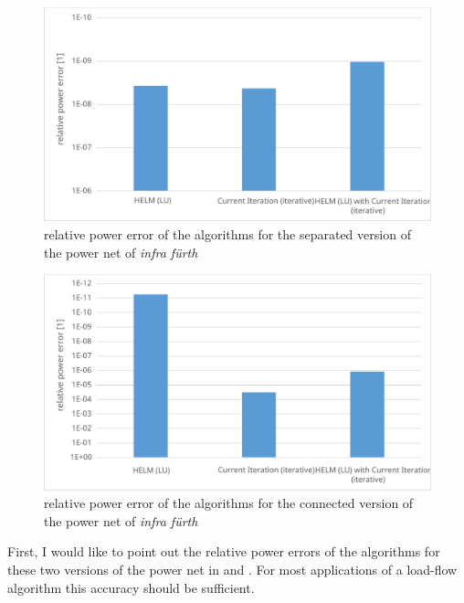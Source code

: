 \begin{figure}
	\centering
	\includegraphics[scale=0.7]{figures/big_net_separate_relative_power_error}
	\caption[Comparison, \emph{infra fürth}, separate, error]{relative power error of the algorithms for the separated version of the power net of \emph{infra fürth}}
	\label{fig:big_net_separate_relative_power_error}
\end{figure}

\begin{figure}
	\centering
	\includegraphics[scale=0.7]{figures/big_net_combined_relative_power_error}
	\caption[Comparison, \emph{infra fürth}, connected, error]{relative power error of the algorithms for the connected version of the power net of \emph{infra fürth}}
	\label{fig:big_net_combined_relative_power_error}
\end{figure}

First, I would like to point out the relative power errors of the algorithms for these two versions of the power net in  and . For most applications of a load-flow algorithm this accuracy should be sufficient.

